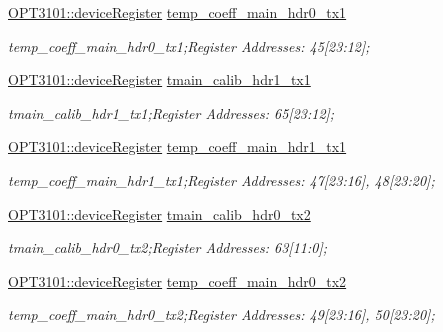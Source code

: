 \begin{DoxyCompactItemize}
\mbox{\hyperlink{class_o_p_t3101_1_1device_register}{O\+P\+T3101\+::device\+Register}} \mbox{\hyperlink{class_o_p_t3101_1_1registers_a0ce99967b663007766113d06d946b28f}{temp\+\_\+coeff\+\_\+main\+\_\+hdr0\+\_\+tx1}}
\begin{DoxyCompactList}\small\item\em temp\+\_\+coeff\+\_\+main\+\_\+hdr0\+\_\+tx1;Register Addresses\+: 45\mbox{[}23\+:12\mbox{]}; \end{DoxyCompactList}\item 
\mbox{\hyperlink{class_o_p_t3101_1_1device_register}{O\+P\+T3101\+::device\+Register}} \mbox{\hyperlink{class_o_p_t3101_1_1registers_a167239301374a042530aecc8a88bc795}{tmain\+\_\+calib\+\_\+hdr1\+\_\+tx1}}
\begin{DoxyCompactList}\small\item\em tmain\+\_\+calib\+\_\+hdr1\+\_\+tx1;Register Addresses\+: 65\mbox{[}23\+:12\mbox{]}; \end{DoxyCompactList}\item 
\mbox{\hyperlink{class_o_p_t3101_1_1device_register}{O\+P\+T3101\+::device\+Register}} \mbox{\hyperlink{class_o_p_t3101_1_1registers_a59dcda2fcbc9a2faa4b62e1c982578c3}{temp\+\_\+coeff\+\_\+main\+\_\+hdr1\+\_\+tx1}}
\begin{DoxyCompactList}\small\item\em temp\+\_\+coeff\+\_\+main\+\_\+hdr1\+\_\+tx1;Register Addresses\+: 47\mbox{[}23\+:16\mbox{]}, 48\mbox{[}23\+:20\mbox{]}; \end{DoxyCompactList}\item 
\mbox{\hyperlink{class_o_p_t3101_1_1device_register}{O\+P\+T3101\+::device\+Register}} \mbox{\hyperlink{class_o_p_t3101_1_1registers_a3ba1ce14ec5570b329925e06b7c96438}{tmain\+\_\+calib\+\_\+hdr0\+\_\+tx2}}
\begin{DoxyCompactList}\small\item\em tmain\+\_\+calib\+\_\+hdr0\+\_\+tx2;Register Addresses\+: 63\mbox{[}11\+:0\mbox{]}; \end{DoxyCompactList}\item 
\mbox{\hyperlink{class_o_p_t3101_1_1device_register}{O\+P\+T3101\+::device\+Register}} \mbox{\hyperlink{class_o_p_t3101_1_1registers_a602644cf2ed2fbb0cd711f07cc19bf6e}{temp\+\_\+coeff\+\_\+main\+\_\+hdr0\+\_\+tx2}}
\begin{DoxyCompactList}\small\item\em temp\+\_\+coeff\+\_\+main\+\_\+hdr0\+\_\+tx2;Register Addresses\+: 49\mbox{[}23\+:16\mbox{]}, 50\mbox{[}23\+:20\mbox{]}; \end{DoxyCompactList}\item 

\end{DoxyCompactItemize}
